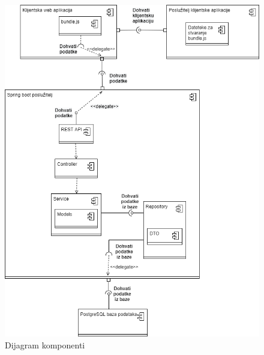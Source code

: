 		\begin{figure}[H]
            \includegraphics[scale=0.40]{slike/Dijagram komponenti 1_0.png}
        	\centering
        	\caption{Dijagram komponenti}
        	\label{fig:dk}
        \end{figure}
		

